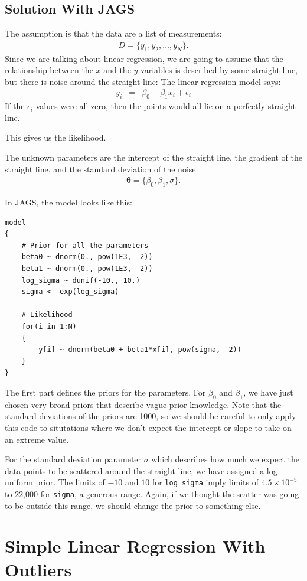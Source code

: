 \section{Solution With JAGS}
The assumption is that the data are a list of measurements:
\begin{eqnarray}
D = \{y_1, y_2, ..., y_N\}.
\end{eqnarray}
Since we are talking about linear regression, we are going to assume that the
relationship between the $x$ and the $y$ variables is described by some
straight line, but there is noise around the straight line:
The linear regression model says:
\begin{eqnarray}
y_i &=& \beta_0 + \beta_1 x_i + \epsilon_i
\end{eqnarray}
If the $\epsilon_i$ values were all zero, then the points would all lie on
a perfectly straight line.

This gives us the likelihood.

The unknown parameters are the intercept of the straight line, the gradient of
the straight line, and the standard deviation of the noise.
\begin{eqnarray}
\boldsymbol{\theta} = \{\beta_0, \beta_1, \sigma\}.
\end{eqnarray}

In JAGS, the model looks like this:
\begin{framed}
\begin{verbatim}
model
{
    # Prior for all the parameters
    beta0 ~ dnorm(0., pow(1E3, -2))
    beta1 ~ dnorm(0., pow(1E3, -2))
    log_sigma ~ dunif(-10., 10.)
    sigma <- exp(log_sigma)

    # Likelihood
    for(i in 1:N)
    {
        y[i] ~ dnorm(beta0 + beta1*x[i], pow(sigma, -2))
    }
}
\end{verbatim}
\end{framed}
The first part defines the priors for the parameters. For $\beta_0$ and $\beta_1$,
we have just chosen very broad priors that describe vague prior knowledge. Note
that the standard deviations of the priors are 1000, so we should be careful
to only apply this code to situtations where we don't expect the intercept or
slope to take on an extreme value.

For the standard deviation parameter $\sigma$ which describes how much we
expect the data points to be scattered around the straight line, we have assigned
a log-uniform prior. The limits of $-10$ and $10$ for {\tt log\_sigma} imply
limits of $4.5 \times 10^{-5}$ to 22,000 for {\tt sigma}, a generous range.
Again, if we thought the scatter
was going to be outside this range, we should change the prior to something
else.



\chapter{Simple Linear Regression With Outliers}

